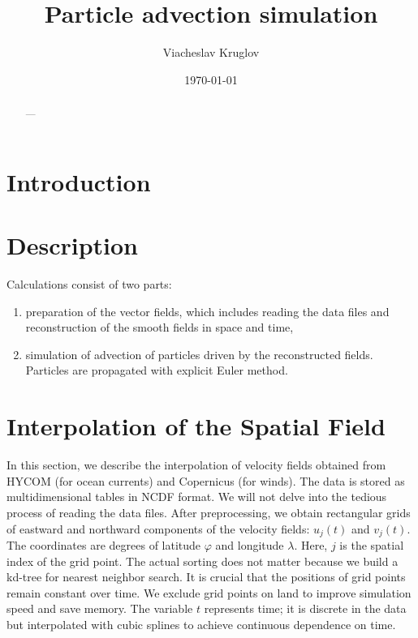 \documentclass[12pt]{article}
\title{Particle advection simulation}
\author{Viacheslav Kruglov}
\date{\today}
\begin{document}
\maketitle

\begin{abstract}
---
\end{abstract}

\section{Introduction}

\section{Description}

Calculations consist of two parts:

\begin{enumerate}
\item preparation of the vector fields, which includes reading the data files and reconstruction of the smooth fields in space and time,
\item simulation of advection of particles driven by the reconstructed fields. 
Particles are propagated with explicit Euler method.
\end{enumerate}

\section{Interpolation of the Spatial Field}

In this section, we describe the interpolation of velocity fields obtained from HYCOM (for ocean currents) and Copernicus (for winds).
The data is stored as multidimensional tables in NCDF format.
We will not delve into the tedious process of reading the data files.
After preprocessing, we obtain rectangular grids of eastward and northward components of the velocity fields: $u_j (t)$ and $v_j (t)$.
The coordinates are degrees of latitude $\varphi$ and longitude $\lambda$.
Here, $j$ is the spatial index of the grid point.
The actual sorting does not matter because we build a kd-tree for nearest neighbor search.
It is crucial that the positions of grid points remain constant over time.
We exclude grid points on land to improve simulation speed and save memory.
The variable $t$ represents time; it is discrete in the data but interpolated with cubic splines to achieve continuous dependence on time.
\end{document}

